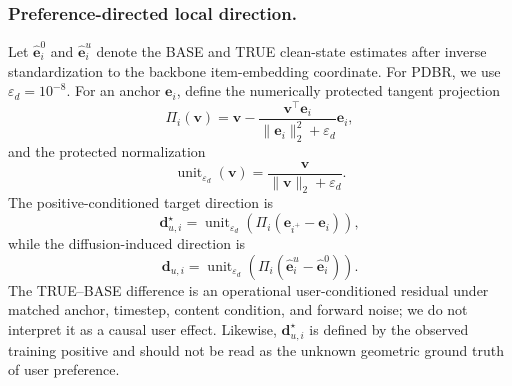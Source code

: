 \documentclass[sigconf,anonymous,review]{acmart}
\begin{document}
\subsubsection{Preference-directed local direction.}
Let $\widehat{\mathbf{e}}_i^{0}$ and $\widehat{\mathbf{e}}_i^{u}$ denote the BASE and TRUE clean-state estimates after inverse standardization to the backbone item-embedding coordinate.
For PDBR, we use $\varepsilon_d=10^{-8}$. For an anchor $\mathbf{e}_i$, define the numerically protected tangent projection
\begin{equation}
    \Pi_i(\mathbf{v})
    =
    \mathbf{v}
    -
    \frac{\mathbf{v}^{\top}\mathbf{e}_i}
    {\|\mathbf{e}_i\|_2^2+\varepsilon_d}
    \mathbf{e}_i,
    \label{eq:tangent}
\end{equation}
and the protected normalization
\begin{equation}
    \operatorname{unit}_{\varepsilon_d}(\mathbf{v})
    =
    \frac{\mathbf{v}}{\|\mathbf{v}\|_2+\varepsilon_d}.
\end{equation}
The positive-conditioned target direction is
\begin{equation}
    \mathbf{d}^{\star}_{u,i}
    =
    \operatorname{unit}_{\varepsilon_d}\!\left(
      \Pi_i(\mathbf{e}_{i^+}-\mathbf{e}_i)
    \right),
    \label{eq:prefdir}
\end{equation}
while the diffusion-induced direction is
\begin{equation}
    \mathbf{d}_{u,i}
    =
    \operatorname{unit}_{\varepsilon_d}\!\left(
      \Pi_i(\widehat{\mathbf{e}}_i^{u}-\widehat{\mathbf{e}}_i^{0})
    \right).
    \label{eq:diffdir}
\end{equation}
The TRUE--BASE difference is an operational user-conditioned residual under matched anchor, timestep, content condition, and forward noise; we do not interpret it as a causal user effect.
Likewise, $\mathbf{d}^{\star}_{u,i}$ is defined by the observed training positive and should not be read as the unknown geometric ground truth of user preference.
\end{document}
